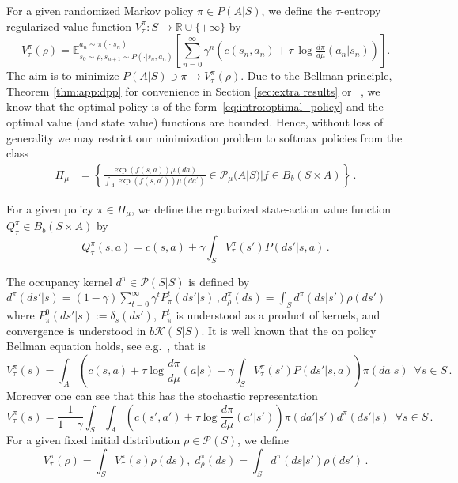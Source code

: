 \documentclass{amsart}
\theoremstyle{definition}
\begin{document}
For a given randomized Markov policy $\pi\in P(A|S)$, we define the $\tau$-entropy regularized value function $V^{\pi}_{\tau}:S\rightarrow \mathbb{R}\cup\{+\infty\}$  by
\[
V^{\pi}_{\tau}(\rho)= \mathbb{E}_{s_0 \sim \rho,s_{n+1}\sim P(\cdot|s_n,a_n)}^{a_n\sim \pi(\cdot|s_n)}\left[\sum_{n=0}^{\infty}\gamma^{n} \left(c(s_n,a_n)+\tau\,\log\tfrac{d\pi}{d\mu}(a_n|s_n)\right)\right].
\]
The aim is to minimize $P(A|S)\ni \pi \mapsto V^{\pi}_{\tau}(\rho)$.
Due to the Bellman principle, Theorem \ref{thm:app:dpp} for convenience in Section \ref{sec:extra results} or ~\cite{ziebart2010modeling, haarnoja2017reinforcement, geist2019theory}, 
we know that the optimal policy is of the form~\eqref{eq:intro:optimal_policy} 
and the optimal value (and state value) functions are bounded.
Hence, without loss of generality we may restrict our minimization problem to softmax policies from the class
\begin{align}\label
{def:Pi_class}
\Pi_{\mu} &=\left\{\tfrac{\exp(f(s,a))\mu(da)}{\int_{A} \exp(f(s,a^\prime))\mu(da^\prime)}\in \mathcal{P}_{\mu}(A|S) | f\in B_b(S\times A)\right\}  \,.
\end{align}



For a given policy $\pi\in\Pi_{\mu}$, we define the regularized state-action value function $Q^{\pi}_{\tau}\in B_b(S\times A)$ by
\begin{equation}\label{def:intro:Qpi}
Q^{\pi}_{\tau}(s,a)=c(s,a)+\gamma\int_{S}V^{\pi}_{\tau}(s')P(ds'|s,a)\,.
\end{equation}

The occupancy kernel $d^{\pi}\in \mathcal{P}(S|S)$ is defined by $d^{\pi}(ds'|s)=(1-\gamma)\sum_{t=0}^{\infty}\gamma^t P^t_{\pi}(ds'|s)\,, d^{\pi}_{\rho}(ds)=\int_{S}d^{\pi}(ds|s')\rho(ds')$
where $P^0_{\pi}(ds'|s):=\delta_s(ds')$, $P^t_{\pi}$ is understood as a product of kernels, and convergence is understood in $b\mathcal{K}(S|S)$. 
It is well known that the on policy Bellman equation holds, see e.g.~\cite[Lemma B.2] {kerimkulov2025fisher}, that is
\begin{equation}
\label{eq:intro:policy_Bellman}
V^{\pi}_{\tau}(s) = \int_{A}\left(c(s,a)+\tau\log\frac{d\pi}{d\mu}(a|s) +\gamma\int_{S}V^{\pi}_{\tau}(s')P(ds'|s,a)\right)\pi(da|s) \,\,\, \forall s\in S\,.
\end{equation}
Moreover one can see that this has the stochastic representation 
\begin{equation}
\label{eq:intro:value_function_occ}
V^{\pi}_{\tau}(s) =\frac{1}{1-\gamma}\int_{S}\int_{A}\left(c(s',a')+\tau \log \frac{d\pi}{d\mu}(a'|s')\right)\pi(da'|s')d^{\pi}(ds'|s)\,\,\, \forall s\in S\,.
\end{equation}
For a given fixed initial distribution $\rho\in\mathcal{P}(S)$, we define 
\[
V^{\pi}_{\tau}(\rho)=\int_{S}V^{\pi}_{\tau}(s)\rho(ds), \;  d^{\pi}_{\rho}(ds)=\int_{S}d^{\pi}(ds|s')\rho(ds')\,.
\]
\end{document}
